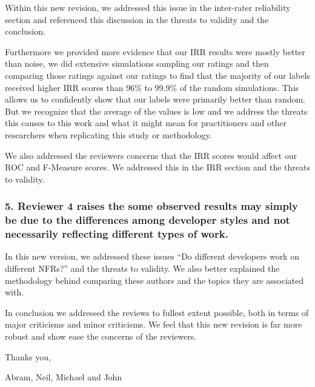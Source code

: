\documentclass{article}
\begin{document}
Within this new revision, we addressed this issue in the inter-rater
reliability section and referenced this discussion in the threats to
validity and the conclusion. 

Furthermore we provided more evidence that our IRR results were mostly
better than noise, we did extensive simulations sampling our ratings
and then comparing those ratings against our ratings to find that the
majority of our labels received higher IRR scores than 96\% to 99.9\%
of the random simulations. This allows us to confidently show that our
labels were primarily better than random. But we recognize that the
average of the values is low and we address the threats this causes to
this work and what it might mean for practitioners and other
researchers when replicating this study or methodology.

We also addressed the reviewers concerns that the IRR scores would
affect our ROC and F-Measure scores. We addressed this in the IRR
section and the threats to validity.

\subsubsection*{5. Reviewer 4 raises the some observed results may simply be due to
 the differences among developer styles and not necessarily
 reflecting different types of work. }

In this new version, we addressed these issues ``Do different
developers work on different NFRs?''  and the threats to validity. We
also better explained the methodology behind comparing these authors
and the topics they are associated with.

In conclusion we addressed the reviews to fullest extent possible,
both in terms of major criticisms and minor criticisms. We feel that
this new revision is far more robust and show ease the concerns of the
reviewers.

Thanks you,

Abram, Neil, Michael and John
\end{document}
